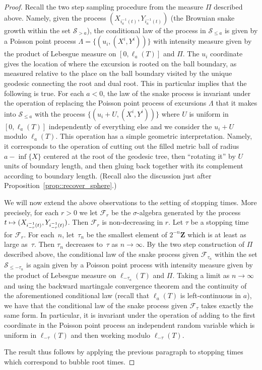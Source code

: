 \documentclass[10pt]{amsart}
\let\mathcal\mathscr
\newcommand\mto{\mathchoice{\longmapsto}{\mapsto}{\mapsto}{\mapsto}}
\theoremstyle{plain}
\numberwithin{theorem}{section}
\theoremstyle{definition}
\newcommand{\CF}{{\mathcal F}}
\newcommand{\snake}{{\mathcal S}}
\newcommand{\Z}{\mathbf{Z}}
\let\snakeexcursionmeasure \Pi
\begin{document}
\begin{proof}
Recall the two step sampling procedure from the measure $\snakeexcursionmeasure$ described above. Namely, given the process $(X_{i_a^{-1}(t)},Y_{i_a^{-1}(t)})$ (\ie the Brownian snake growth within the set $\snake_{>a}$), the conditional law of the process in $\snake_{\leq a}$ is given by a Poisson point process $\Lambda = \{ (u_i,(X^i,Y^i))\}$ with intensity measure given by the product of Lebesgue measure on $[0,\ell_a(T)]$ and $\snakeexcursionmeasure$. The $u_i$ coordinate gives the location of where the excursion is rooted on the ball boundary, as measured relative to the place on the ball boundary visited by the unique geodesic connecting the root and dual root. This in particular implies that the following is true. For each $a < 0$, the law of the snake process is invariant under the operation of replacing the Poisson point process of excursions $\Lambda$ that it makes into $\snake_{\leq a}$ with the process $\{ (u_i + U,(X^i,Y^i))\}$ where $U$ is uniform in $[0,\ell_a(T)]$ independently of everything else and we consider the $u_i + U$ modulo $\ell_a(T)$. This operation has a simple geometric interpretation. Namely, it corresponds to the operation of cutting out the filled metric ball of radius $a-\inf\{X\}$ centered at the root of the geodesic tree, then ``rotating it'' by $U$ units of boundary length, and then gluing back together with its complement according to boundary length. (Recall also the discussion just after Proposition~\ref{prop::recover_sphere}.)\enlargethispage{.5\baselineskip}

We will now extend the above observations to the setting of stopping times. More precisely, for each $r > 0$ we let $\CF_r$ be the $\sigma$-algebra generated by the process $t \mto (X_{i_{-r}^{-1}(t)},Y_{i_{-r}^{-1}(t)})$. Then $\CF_r$ is non-decreasing in $r$. Let $\tau$ be a stopping time for $\CF_r$. For each~$n$, let~$\tau_n$ be the smallest element of $2^{-n} \Z$ which is at least as large as~$\tau$. Then $\tau_n$ decreases to~$\tau$ as $n \to \infty$. By the two step construction of $\Pi$ described above, the conditional law of the snake process given $\CF_{\tau_n}$ within the set $\snake_{\leq -\tau_n}$ is again given by a Poisson point process with intensity measure given by the product of Lebesgue measure on $\ell_{-\tau_n}(T)$ and $\Pi$. Taking a limit as $n \to \infty$ and using the backward martingale convergence theorem and the continuity of the aforementioned conditional law (recall that $\ell_a(T)$ is left-continuous in $a$), we have that the conditional law of the snake process given $\CF_\tau$ takes exactly the same form. In particular, it is invariant under the operation of adding to the first coordinate in the Poisson point process an independent random variable which is uniform in $\ell_{-\tau}(T)$ and then working modulo $\ell_{-\tau}(T)$.

The result thus follows by applying the previous paragraph to stopping times which correspond to bubble root times.
\end{proof}
\end{document}

